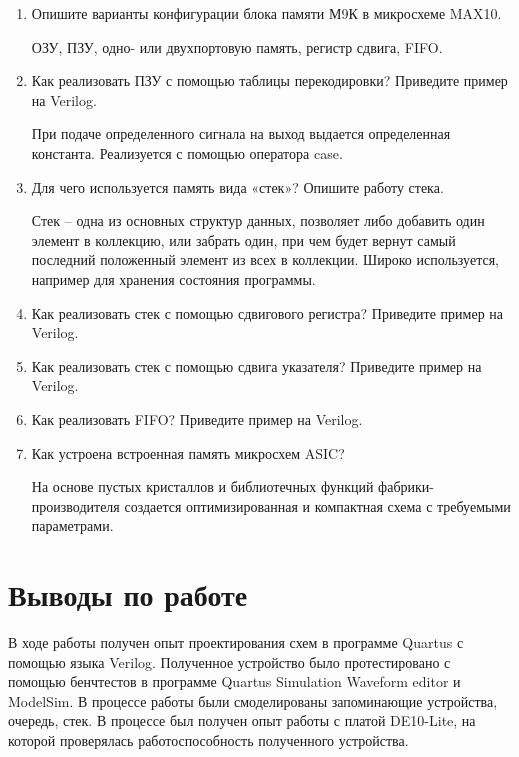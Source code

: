\documentclass[a4paper,14pt]{article}
\begin{document}
\begin{enumerate}
		\item Опишите варианты конфигурации блока памяти М9К в микросхеме MAX10.
		
		ОЗУ, ПЗУ, одно- или двухпортовую память, регистр сдвига, FIFO.
		
		\item Как реализовать ПЗУ с помощью таблицы перекодировки? Приведите пример на Verilog.
		
		При подаче определенного сигнала на выход выдается определенная константа.
		Реализуется с помощью оператора case.
		
		\item Для чего используется память вида «стек»? Опишите работу стека.
		
		Стек -- одна из основных структур данных, позволяет либо добавить один элемент в коллекцию, или забрать один, при чем будет вернут самый последний положенный элемент из всех в коллекции.
		Широко используется, например для хранения состояния программы.
		
		\item Как реализовать стек с помощью сдвигового регистра? Приведите пример на Verilog.
		
		\item Как реализовать стек с помощью сдвига указателя? Приведите пример на Verilog.
		
		\item Как реализовать FIFO? Приведите пример на Verilog.
		
		\item Как устроена встроенная память микросхем ASIC?
		
		На основе пустых кристаллов и библиотечных функций фабрики-производителя создается оптимизированная и компактная схема с требуемыми параметрами.
		
	\end{enumerate}
	
	\section{Выводы по работе}
	
	В ходе работы получен опыт проектирования схем в программе Quartus с помощью языка Verilog.
	Полученное устройство было протестировано с помощью бенчтестов в программе Quartus Simulation Waveform editor и ModelSim.
	В процессе работы были смоделированы запоминающие устройства, очередь, стек.
	В процессе был получен опыт работы с платой DE10-Lite, на которой проверялась работоспособность полученного устройства.
	
\end{document}
